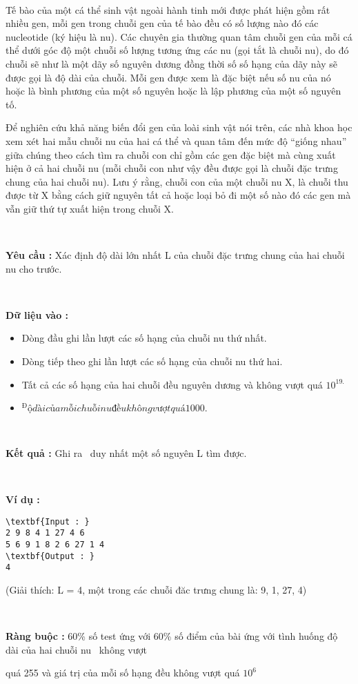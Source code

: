 

 

Tế bào của một cá thể sinh vật ngoài hành tinh mới được phát hiện gồm rất nhiều gen, mỗi gen trong chuỗi gen của tế bào đều có số lượng nào đó các nucleotide (ký hiệu là nu). Các chuyên gia thường quan tâm chuỗi gen của mỗi cá thể dưới góc độ một chuỗi số lượng tương ứng các nu (gọi tắt là chuỗi nu), do đó chuỗi sẽ như là một dãy số nguyên dương đồng thời số số hạng của dãy này sẽ được gọi là độ dài của chuỗi. Mỗi gen được xem là đặc biệt nếu số nu của nó hoặc là bình phương của một số nguyên hoặc là lập phương của một số nguyên tố.

Để nghiên cứu khả năng biến đổi gen của loài sinh vật nói trên, các nhà khoa học xem xét hai mẫu chuỗi nu của hai cá thể và quan tâm đến mức độ “giống nhau” giữa chúng theo cách tìm ra chuỗi con chỉ gồm các gen đặc biệt mà cùng xuất hiện ở cả hai chuỗi nu (mỗi chuỗi con như vậy đều được gọi là chuỗi đặc trưng chung của hai chuỗi nu). Lưu ý rằng, chuỗi con của một chuỗi nu X, là chuỗi thu được từ X bằng cách giữ nguyên tất cả hoặc loại bỏ đi một số nào đó các gen mà vẫn giữ thứ tự xuất hiện trong chuỗi X.

 

\textbf{Yêu cầu : } Xác định độ dài lớn nhất L của chuỗi đặc trưng chung của hai chuỗi nu cho trước.

 

\textbf{Dữ liệu vào : }
\begin{itemize}
	\item Dòng đầu ghi lần lượt các số hạng của chuỗi nu thứ nhất.
	\item Dòng tiếp theo ghi lần lượt các số hạng của chuỗi nu thứ hai.
	\item Tất cả các số hạng của hai chuỗi đều nguyên dương và không vượt quá $10^{19.}$
	\item $^Độ dài của mỗi chuỗi nu đều không vượt quá 1000.$
\end{itemize}

 

\textbf{Kết quả : } Ghi ra  duy nhất một số nguyên L tìm được.

 

\textbf{Ví dụ : }
\begin{verbatim}
\textbf{Input : }
2 9 8 4 1 27 4 6
5 6 9 1 8 2 6 27 1 4
\textbf{Output : }
4\end{verbatim}

(Giải thích: L = 4, một trong các chuỗi đăc trưng chung là: 9, 1, 27, 4)

 

\textbf{Ràng buộc : } 60\% số test ứng với 60\% số điểm của bài ứng với tình huống độ dài của hai chuỗi nu  không vượt

quá 255 và giá trị của mỗi số hạng đều không vượt quá $10^{6}$

